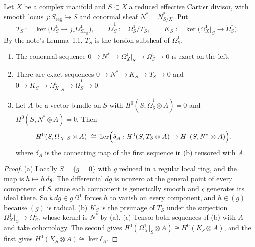 Let $X$ be a complex manifold and $S\subset X$ a reduced effective Cartier divisor, with smooth locus $j:S_{\mathrm{reg}}\hookrightarrow S$ and conormal sheaf $N^*=N^*_{S/X}$. Put
\[
T_S:=\ker\bigl(\Omega^1_S\to j_*\Omega^1_{S_{\mathrm{reg}}}\bigr),\qquad \widetilde\Omega^1_S:=\Omega^1_S/T_S,\qquad K_S:=\ker\bigl(\Omega^1_X|_S\to\widetilde\Omega^1_S\bigr).
\]
By the note's Lemma~1.1, $T_S$ is the torsion subsheaf of $\Omega^1_S$.

\begin{proposition}\label{prop:filtration}
\leavevmode
\begin{enumerate}[label=\textup{(\alph*)}]
\item The conormal sequence $0\to N^*\to\Omega^1_X|_S\to\Omega^1_S\to0$ is exact on the left.
\item There are exact sequences $0\to N^*\to K_S\to T_S\to0$ and $0\to K_S\to\Omega^1_X|_S\to\widetilde\Omega^1_S\to0$.
\item Let $A$ be a vector bundle on $S$ with $H^0(S,\widetilde\Omega^1_S\otimes A)=0$ and $H^0(S,N^*\otimes A)=0$. Then
\[
H^0(S,\Omega^1_X|_S\otimes A)\;\cong\;\ker\Bigl(\delta_A:H^0(S,T_S\otimes A)\to H^1(S,N^*\otimes A)\Bigr),
\]
where $\delta_A$ is the connecting map of the first sequence in \textup{(b)} tensored with $A$.
\end{enumerate}
\end{proposition}

\begin{proof}
(a) Locally $S=\{g=0\}$ with $g$ reduced in a regular local ring, and the map is $\bar h\mapsto h\,dg$. The differential $dg$ is nonzero at the general point of every component of $S$, since each component is generically smooth and $g$ generates its ideal there. So $h\,dg\in g\,\Omega^1$ forces $h$ to vanish on every component, and $h\in(g)$ because $(g)$ is radical.
(b) $K_S$ is the preimage of $T_S$ under the surjection $\Omega^1_X|_S\to\Omega^1_S$, whose kernel is $N^*$ by (a).
(c) Tensor both sequences of (b) with $A$ and take cohomology. The second gives $H^0(\Omega^1_X|_S\otimes A)\cong H^0(K_S\otimes A)$, and the first gives $H^0(K_S\otimes A)\cong\ker\delta_A$.
\end{proof}


